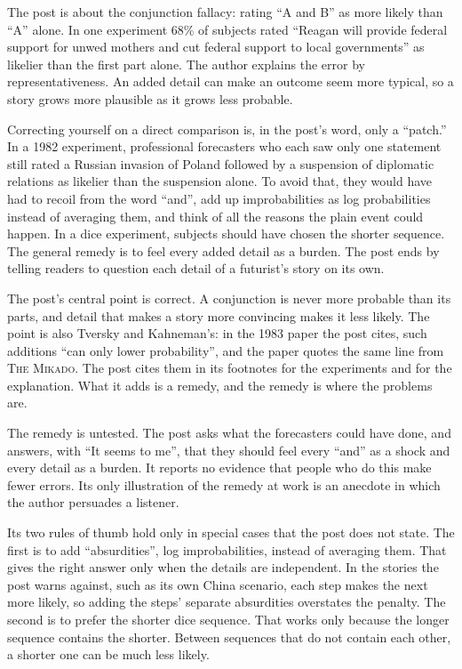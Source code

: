 \begin{afterword}
\summaryhead

The post is about the conjunction fallacy: rating ``A and B'' as more likely than ``A'' alone. In one experiment 68\% of subjects rated ``Reagan will provide federal support for unwed mothers and cut federal support to local governments'' as likelier than the first part alone. The author explains the error by representativeness. An added detail can make an outcome seem more typical, so a story grows more plausible as it grows less probable.

Correcting yourself on a direct comparison is, in the post's word, only a ``patch.'' In a 1982 experiment, professional forecasters who each saw only one statement still rated a Russian invasion of Poland followed by a suspension of diplomatic relations as likelier than the suspension alone. To avoid that, they would have had to recoil from the word ``and'', add up improbabilities as log probabilities instead of averaging them, and think of all the reasons the plain event could happen. In a dice experiment, subjects should have chosen the shorter sequence. The general remedy is to feel every added detail as a burden. The post ends by telling readers to question each detail of a futurist's story on its own.

\responsehead

The post's central point is correct. A conjunction is never more probable than its parts, and detail that makes a story more convincing makes it less likely. The point is also Tversky and Kahneman's: in the 1983 paper the post cites, such additions ``can only lower probability'', and the paper quotes the same line from \textsc{The Mikado}. The post cites them in its footnotes for the experiments and for the explanation. What it adds is a remedy, and the remedy is where the problems are.

The remedy is untested. The post asks what the forecasters could have done, and answers, with ``It seems to me'', that they should feel every ``and'' as a shock and every detail as a burden. It reports no evidence that people who do this make fewer errors. Its only illustration of the remedy at work is an anecdote in which the author persuades a listener.

Its two rules of thumb hold only in special cases that the post does not state. The first is to add ``absurdities'', log improbabilities, instead of averaging them. That gives the right answer only when the details are independent. In the stories the post warns against, such as its own China scenario, each step makes the next more likely, so adding the steps' separate absurdities overstates the penalty. The second is to prefer the shorter dice sequence. That works only because the longer sequence contains the shorter. Between sequences that do not contain each other, a shorter one can be much less likely.


\end{afterword}
